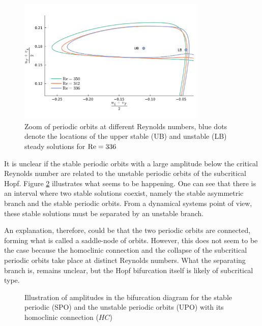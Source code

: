 \begin{figure}[h]
  \centering
  \includegraphics[trim={0 1cm 0 1cm},clip,width=0.8\textwidth]{figs/orbits_zoom64x64.pdf}
  \caption{Zoom of periodic orbits at different Reynolds numbers, blue dots
    denote the locations of the upper stable (UB) and unstable (LB) steady
    solutions for $\mathrm{Re} = 336$}
  \label{fig:orbits_zoom}
\end{figure}

It is unclear if the stable periodic orbits with a large amplitude below the
critical Reynolds number are related to the unstable periodic orbits of the
subcritical Hopf. Figure \ref{fig:sub_hopf_sketch} illustrates what seems to be
happening. One can see that there is an interval where two stable solutions
coexist, namely the stable asymmetric branch and the stable periodic orbits.
From a dynamical systems point of view, these stable solutions must be
separated by an unstable branch. 

An explanation, therefore, could be that the two periodic orbits are connected,
forming what is called a saddle-node of orbits. However, this does not seem to
be the case because the homoclinic connection and the collapse of the
subcritical periodic orbits take place at distinct Reynolds numbers. What the
separating branch is, remains unclear, but the Hopf bifurcation itself is
likely of subcritical type.

\begin{figure}[h!]
\centering
{}
\caption{Illustration of amplitudes in the bifurcation diagram for the stable
  periodic (SPO) and the unstable periodic orbits (UPO) with its homoclinic
  connection ($HC$)} 
\label{fig:sub_hopf_sketch}
\end{figure}

